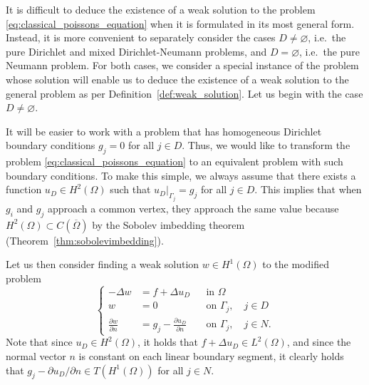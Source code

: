 \documentclass[english, 12pt, a4paper, sci, utf8, a-2b, online]{aaltothesis}
\theoremstyle{definition}
\theoremstyle{plain}
\numberwithin{equation}{section}
\begin{document}
It is difficult to deduce the existence of a weak solution to the problem
\eqref{eq:classical_poissons_equation} when it is formulated in its most
general form. Instead, it is more convenient
to separately consider the cases $D \neq \varnothing$,
i.e.\ the pure Dirichlet and mixed Dirichlet-Neumann problems, and
$D = \varnothing$, i.e.\ the pure Neumann problem.
For both cases, we consider a special instance of the problem whose
solution will enable us to deduce the existence of a weak solution
to the general problem as per Definition~\ref{def:weak_solution}.
Let us begin with the case $D \neq \varnothing$.

It will be easier to work with
a problem that has homogeneous Dirichlet boundary conditions
$g_j = 0$ for all $j \in D$.
Thus, we would like to transform the problem \eqref{eq:classical_poissons_equation}
to an equivalent problem with such boundary conditions.
To make this simple, we always assume that there exists a function
$u_D \in H^2(\Omega)$ such that $u_D|_{\Gamma_j} = g_j$ for all $j \in D$.
This implies that when $g_i$ and $g_j$ approach a common vertex,
they approach the same value because $H^2(\Omega) \subset C(\overline{\Omega})$
by the Sobolev imbedding theorem (Theorem~\ref{thm:sobolevimbedding}).

Let us then consider finding a weak solution $w \in H^1(\Omega)$ to the modified problem
\begin{equation}
    \label{eq:poissons_equation_modified}
    \left\{
        \begin{aligned}
            -\Delta w &= f + \Delta u_D && \text{in } \Omega \\
            w &= 0 && \text{on } \Gamma_j, \quad j \in D \\
            \frac{\partial w}{\partial n} &=
                g_j - \frac{\partial u_D}{\partial n} && \text{on } \Gamma_j,
                \quad j \in N.
        \end{aligned}
    \right.
\end{equation}
Note that since $u_D \in H^2(\Omega)$, it holds that
$f + \Delta u_D \in L^2(\Omega)$, and since the normal vector $n$
is constant on each linear boundary segment, it clearly holds that
$g_j - \partial u_D / \partial n \in T(H^1(\Omega))$ for all $j \in N$.
\end{document}

